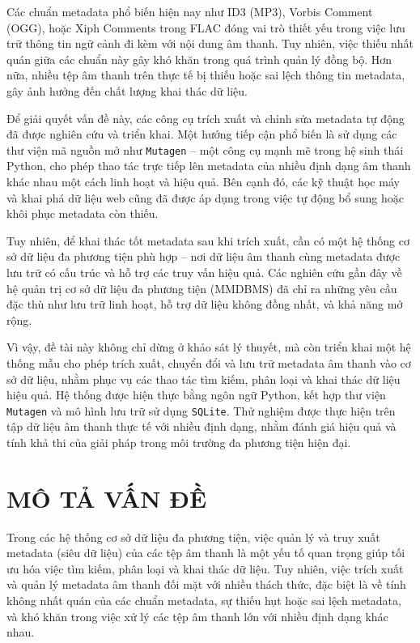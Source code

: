 \documentclass[conference]{IEEEtran}
\begin{document}
Các chuẩn metadata phổ biến hiện nay như ID3 (MP3), 
Vorbis Comment (OGG), hoặc Xiph Comments trong FLAC đóng vai trò thiết yếu 
trong việc lưu trữ thông tin ngữ cảnh đi kèm với nội dung âm thanh. 
Tuy nhiên, việc thiếu nhất quán giữa các chuẩn này gây khó khăn trong quá trình quản lý đồng bộ. 
Hơn nữa, nhiều tệp âm thanh trên thực tế bị thiếu hoặc sai lệch thông tin metadata, gây ảnh hưởng đến chất lượng khai thác dữ liệu.

Để giải quyết vấn đề này, các công cụ trích xuất và chỉnh sửa metadata tự động đã được nghiên cứu và triển khai. 
Một hướng tiếp cận phổ biến là sử dụng các thư viện mã nguồn mở như \texttt{Mutagen} – 
một công cụ mạnh mẽ trong hệ sinh thái Python, cho phép thao tác trực tiếp lên metadata 
của nhiều định dạng âm thanh khác nhau một cách linh hoạt và hiệu quả. Bên cạnh đó, 
các kỹ thuật học máy và khai phá dữ liệu web cũng đã được áp dụng trong việc tự động bổ sung hoặc khôi phục metadata còn thiếu.

Tuy nhiên, để khai thác tốt metadata sau khi trích xuất, cần có một hệ thống cơ sở dữ liệu đa phương tiện phù hợp 
– nơi dữ liệu âm thanh cùng metadata được lưu trữ có cấu trúc và hỗ trợ các truy vấn hiệu quả. 
Các nghiên cứu gần đây về hệ quản trị cơ sở dữ liệu đa phương tiện (MMDBMS) 
đã chỉ ra những yêu cầu đặc thù như lưu trữ linh hoạt, hỗ trợ dữ liệu không đồng nhất, và khả năng mở rộng.

Vì vậy, đề tài này không chỉ dừng ở khảo sát lý thuyết, mà còn triển khai một hệ thống mẫu cho phép trích xuất, 
chuyển đổi và lưu trữ metadata âm thanh vào cơ sở dữ liệu, nhằm phục vụ các thao tác tìm kiếm, 
phân loại và khai thác dữ liệu hiệu quả. Hệ thống được hiện thực bằng ngôn ngữ Python, 
kết hợp thư viện \texttt{Mutagen} và mô hình lưu trữ sử dụng \texttt{SQLite}. 
Thử nghiệm được thực hiện trên tập dữ liệu âm thanh thực tế với nhiều định dạng, 
nhằm đánh giá hiệu quả và tính khả thi của giải pháp trong môi trường đa phương tiện hiện đại.

\section{MÔ TẢ VẤN ĐỀ}
Trong các hệ thống cơ sở dữ liệu đa phương tiện, việc quản lý và truy xuất metadata (siêu dữ liệu) của các tệp âm thanh là một yếu tố quan trọng giúp tối ưu hóa việc tìm kiếm, phân loại và khai thác dữ liệu. Tuy nhiên, việc trích xuất và quản lý metadata âm thanh đối mặt với nhiều thách thức, đặc biệt là về tính không nhất quán của các chuẩn metadata, sự thiếu hụt hoặc sai lệch metadata, và khó khăn trong việc xử lý các tệp âm thanh lớn với nhiều định dạng khác nhau.
\end{document}

